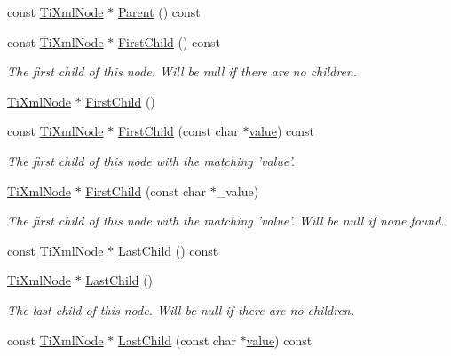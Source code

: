 \begin{DoxyCompactItemize}
const \hyperlink{classTiXmlNode}{TiXmlNode} $\ast$ \hyperlink{classTiXmlNode_a78878709e53066f06eb4fcbcdd3a5260}{Parent} () const 
\item 
const \hyperlink{classTiXmlNode}{TiXmlNode} $\ast$ \hyperlink{classTiXmlNode_a44c8eee26bbe2d1b2762038df9dde2f0}{FirstChild} () const 
\begin{DoxyCompactList}\small\item\em The first child of this node. Will be null if there are no children. \item\end{DoxyCompactList}\item 
\hyperlink{classTiXmlNode}{TiXmlNode} $\ast$ \hyperlink{classTiXmlNode_a5e97d69b7c0ebd27fb7286be56559b77}{FirstChild} ()
\item 
const \hyperlink{classTiXmlNode}{TiXmlNode} $\ast$ \hyperlink{classTiXmlNode_ab5f722624113c8203227de4f56576d31}{FirstChild} (const char $\ast$\hyperlink{classTiXmlNode_aead528b3cedc33c16a6c539872c7cc8b}{value}) const 
\begin{DoxyCompactList}\small\item\em The first child of this node with the matching 'value'. \item\end{DoxyCompactList}\item 
\hyperlink{classTiXmlNode}{TiXmlNode} $\ast$ \hyperlink{classTiXmlNode_abc8bf32be6419ec453a731868de19554}{FirstChild} (const char $\ast$\_\-value)
\begin{DoxyCompactList}\small\item\em The first child of this node with the matching 'value'. Will be null if none found. \item\end{DoxyCompactList}\item 
const \hyperlink{classTiXmlNode}{TiXmlNode} $\ast$ \hyperlink{classTiXmlNode_a6d671107e00cca1d28cb2d7f3a87a21e}{LastChild} () const 
\item 
\hyperlink{classTiXmlNode}{TiXmlNode} $\ast$ \hyperlink{classTiXmlNode_a6432d2b2495f6caf9cb4278df706a031}{LastChild} ()
\begin{DoxyCompactList}\small\item\em The last child of this node. Will be null if there are no children. \item\end{DoxyCompactList}\item 
const \hyperlink{classTiXmlNode}{TiXmlNode} $\ast$ \hyperlink{classTiXmlNode_acdd3fdc436aa7433023310a041e5e63f}{LastChild} (const char $\ast$\hyperlink{classTiXmlNode_aead528b3cedc33c16a6c539872c7cc8b}{value}) const 

\end{DoxyCompactItemize}
